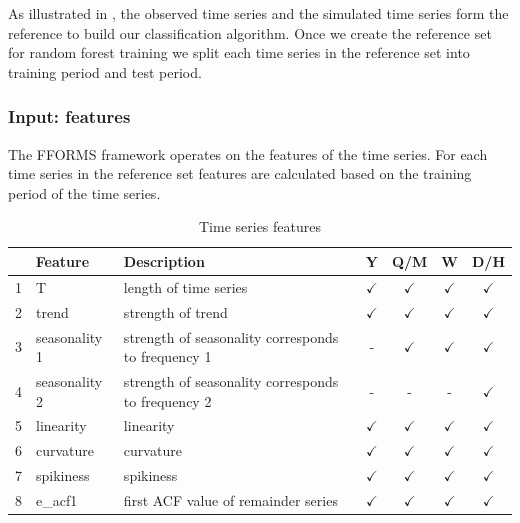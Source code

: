 \documentclass[11pt,a4paper,]{article}
\def\yes{$\checkmark$}
\theoremstyle{definition}
\theoremstyle{definition}
\theoremstyle{definition}
\theoremstyle{remark}
\begin{document}
As illustrated in \textcite{fforms}, the observed time series and the
simulated time series form the reference to build our classification
algorithm. Once we create the reference set for random forest training
we split each time series in the reference set into training period and
test period.

\subsubsection{Input: features}\label{input-features}

The FFORMS framework operates on the features of the time series. For
each time series in the reference set features are calculated based on
the training period of the time series.

\begin{table}[!htp]
\centering\footnotesize\tabcolsep=0.12cm
\caption{Time series features}
\label{feature}
\begin{tabular}{llp{}cccc}
\toprule
\multicolumn{2}{c}{Feature} & Description & Y & Q/M & W & D/H\\
\midrule
1  & T              & length of time series                                                                   & \yes  & \yes & \yes & \yes\\
2  & trend          & strength of trend                                                                       & \yes  & \yes & \yes & \yes\\
3  & seasonality 1    & strength of seasonality corresponds to frequency 1                                                              & -     & \yes & \yes & \yes\\
4  & seasonality 2    & strength of seasonality corresponds to frequency 2                                                              & -     & - & -& \yes\\
5  & linearity      & linearity                                                                               & \yes  & \yes & \yes & \yes\\
6  & curvature      & curvature                                                                               & \yes  & \yes & \yes & \yes\\
7  & spikiness      & spikiness                                                                               & \yes  & \yes & \yes & \yes\\
8  & e\_acf1        & first ACF value of remainder series                                                     & \yes  & \yes & \yes & \yes\\

\end{tabular}
\end{table}
\end{document}
